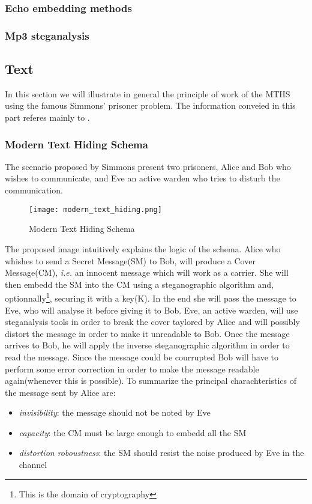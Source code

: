 \documentclass[../../main.tex]{subfiles}
\begin{document}
    \subsubsection{Echo embedding methods}


    \subsubsection{Mp3 steganalysis}

    

    \subsection{Text}
    In this section we will illustrate in general the principle of work of the
    MTHS using the famous Simmons' prisoner problem.
    The information conveied in this part referes mainly to
    \cite{modern-text-hiding}.
    \subsubsection{Modern Text Hiding Schema}
    The scenario proposed by Simmons present two prisoners, Alice and Bob who
    wishes to communicate, and Eve an active warden who tries to disturb the
    communication.
    
    \begin{figure}[h]
        \centering
        \caption{Modern Text Hiding Schema}
        \texttt{[image: modern\_text\_hiding.png]}
    \end{figure}
    
    The proposed image intuitively explains the logic of the schema.
    Alice who whishes to send a Secret Message(SM) to Bob, will produce a Cover
    Message(CM), \emph{i.e.} an innocent message which will work as a carrier.
    She will then embedd the SM into the CM using a steganographic algorithm
    and, optionnally\footnote{This is the domain of cryptography}, securing it
    with a key(K).
    In the end she will pass the message to Eve, who will analyse it before
    giving it to Bob.
    Eve, an active warden, will use steganalysis tools in order to break the
    cover taylored by Alice and will possibly distort the message in order to
    make it unreadable to Bob.
    Once the message arrives to Bob, he will apply the inverse steganographic
    algorithm in order to read the message.
    Since the message could be courrupted Bob will have to perform some error
    correction in order to make the message readable again(whenever this is
    possible).
    To summarize the principal charachteristics of the message sent by Alice
    are:
    \begin{itemize}
        \item \emph{invisibility}: the message should not be noted by Eve
        \item \emph{capacity}: the CM must be large enough to embedd all the SM
        \item \emph{distortion roboustness}: the SM should resist the noise
            produced by Eve in the channel
    \end{itemize}
\end{document}
